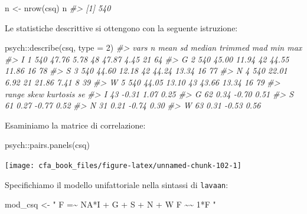 \documentclass[
  11pt,
]{krantz}
\makeatletter
\newenvironment{Shaded}{\begin{snugshade}}{\end{snugshade}}
\newcommand{\AttributeTok}[1]{\textcolor[rgb]{0.61,0.61,0.61}{#1}}
\newcommand{\CommentTok}[1]{\textcolor[rgb]{0.37,0.37,0.37}{\textit{#1}}}
\newcommand{\DecValTok}[1]{\textcolor[rgb]{0.06,0.06,0.06}{#1}}
\newcommand{\FunctionTok}[1]{\textcolor[rgb]{0,0,0}{#1}}
\newcommand{\NormalTok}[1]{#1}
\newcommand{\OtherTok}[1]{\textcolor[rgb]{0.37,0.37,0.37}{#1}}
\newcommand{\SpecialCharTok}[1]{\textcolor[rgb]{0,0,0}{#1}}
\newcommand{\StringTok}[1]{\textcolor[rgb]{0.5,0.5,0.5}{#1}}
\newenvironment{kframe}{%
\medskip{}
\setlength{\fboxsep}{.8em}
 \def\at@end@of@kframe{}%
 \ifinner\ifhmode%
  \def\at@end@of@kframe{\end{minipage}}%
  \begin{minipage}{\columnwidth}%
 \fi\fi%
 \def\FrameCommand##1{\hskip\@totalleftmargin \hskip-\fboxsep
 \colorbox{shadecolor}{##1}\hskip-\fboxsep
     \hskip-\linewidth \hskip-\@totalleftmargin \hskip\columnwidth}%
 \MakeFramed {\advance\hsize-\width
   \@totalleftmargin\z@ \linewidth\hsize
   \@setminipage}}%
 {\par\unskip\endMakeFramed%
 \at@end@of@kframe}
\renewenvironment{Shaded}{\begin{kframe}}{\end{kframe}}
\theoremstyle{definition}
\theoremstyle{definition}
\theoremstyle{definition}
\theoremstyle{definition}
\theoremstyle{remark}
\makeatother
\begin{document}
\begin{Shaded}
\begin{Highlighting}[]
\NormalTok{n }\OtherTok{\textless{}{-}} \FunctionTok{nrow}\NormalTok{(csq)}
\NormalTok{n}
\CommentTok{\#\textgreater{} [1] 540}
\end{Highlighting}
\end{Shaded}

Le statistiche descrittive si ottengono con la seguente istruzione:

\begin{Shaded}
\begin{Highlighting}[]
\NormalTok{psych}\SpecialCharTok{::}\FunctionTok{describe}\NormalTok{(csq, }\AttributeTok{type =} \DecValTok{2}\NormalTok{)}
\CommentTok{\#\textgreater{}   vars   n  mean    sd median trimmed   mad min max}
\CommentTok{\#\textgreater{} I    1 540 47.76  5.78     48   47.87  4.45  21  64}
\CommentTok{\#\textgreater{} G    2 540 45.00 11.94     42   44.55 11.86  16  78}
\CommentTok{\#\textgreater{} S    3 540 44.60 12.18     42   44.24 13.34  16  77}
\CommentTok{\#\textgreater{} N    4 540 22.01  6.92     21   21.86  7.41   8  39}
\CommentTok{\#\textgreater{} W    5 540 44.05 13.10     43   43.66 13.34  16  79}
\CommentTok{\#\textgreater{}   range  skew kurtosis   se}
\CommentTok{\#\textgreater{} I    43 {-}0.31     1.07 0.25}
\CommentTok{\#\textgreater{} G    62  0.34    {-}0.70 0.51}
\CommentTok{\#\textgreater{} S    61  0.27    {-}0.77 0.52}
\CommentTok{\#\textgreater{} N    31  0.21    {-}0.74 0.30}
\CommentTok{\#\textgreater{} W    63  0.31    {-}0.53 0.56}
\end{Highlighting}
\end{Shaded}

Esaminiamo la matrice di correlazione:

\begin{Shaded}
\begin{Highlighting}[]
\NormalTok{psych}\SpecialCharTok{::}\FunctionTok{pairs.panels}\NormalTok{(csq)}
\end{Highlighting}
\end{Shaded}

\begin{center}\texttt{[image: cfa\_book\_files/figure-latex/unnamed-chunk-102-1]} \end{center}

Specifichiamo il modello unifattoriale nella sintassi di \texttt{lavaan}:

\begin{Shaded}
\begin{Highlighting}[]
\NormalTok{mod\_csq }\OtherTok{\textless{}{-}} \StringTok{"}
\StringTok{   F =\textasciitilde{} NA*I + G + S + N + W}
\StringTok{   F \textasciitilde{}\textasciitilde{} 1*F}
\StringTok{"}
\end{Highlighting}
\end{Shaded}
\end{document}
